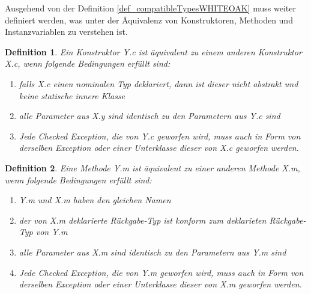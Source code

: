 \documentclass[11pt, 
ngerman,
doublespacing,
chapterinoneline, %
consistentlayout, %
]{scrartcl}
\newtheorem{definition}{Definition}
\begin{document}
Ausgehend von der Definition \ref{def_compatibleTypesWHITEOAK} muss weiter definiert werden, was unter der Äquivalenz von Konstruktoren, Methoden und Instanzvariablen zu verstehen ist.
\begin{definition}\label{def_equiConstWHITEOAK}
Ein Konstruktor \emph{Y.c} ist äquivalent zu einem anderen Konstruktor \emph{X.c}, wenn folgende Bedingungen erfüllt sind:
\begin{enumerate}
\item falls \emph{X.c} einen nominalen Typ deklariert, dann ist dieser nicht abstrakt und keine statische innere Klasse
\item alle Parameter aus \emph{X.y} sind identisch zu den Parametern aus \emph{Y.c} sind
\item Jede Checked Exception, die von \emph{Y.c} geworfen wird, muss auch in Form von derselben Exception oder einer Unterklasse dieser von \emph{X.c} geworfen werden.
\end{enumerate}
\end{definition}

\begin{definition}\label{def_equiMethWHITEOAK}
Eine Methode \emph{Y.m} ist äquivalent zu einer anderen Methode \emph{X.m}, wenn folgende Bedingungen erfüllt sind:
\begin{enumerate}
\item \emph{Y.m} und \emph{X.m} haben den gleichen Namen
\item der von \emph{X.m} deklarierte Rückgabe-Typ ist konform zum deklarieten Rückgabe-Typ von \emph{Y.m}
\item alle Parameter aus \emph{X.m} sind identisch zu den Parametern aus \emph{Y.m} sind
\item Jede Checked Exception, die von \emph{Y.m} geworfen wird, muss auch in Form von derselben Exception oder einer Unterklasse dieser von \emph{X.m} geworfen werden.

\end{enumerate}
\end{definition}
\end{document}
